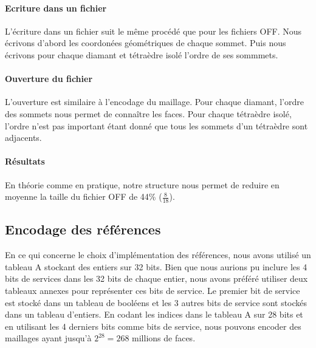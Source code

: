 \paragraph{Ecriture dans un fichier}
L'écriture dans un fichier suit le même procédé que pour les fichiers OFF. Nous écrivons d'abord les coordonées géométriques de chaque sommet. Puis nous écrivons pour chaque diamant et tétraèdre isolé l'ordre de ses sommmets.

\paragraph{Ouverture du fichier}
L'ouverture est similaire à l'encodage du maillage. Pour chaque diamant, l'ordre des sommets nous permet de connaître les faces. Pour chaque tétraèdre isolé, l'ordre n'est pas important étant donné que tous les sommets d'un tétraèdre sont adjacents.

\paragraph{Résultats}
En théorie comme en pratique, notre structure nous permet de reduire en moyenne la taille du fichier OFF de 44\% ($\frac{8}{18}$).

\subsection{Encodage des références}
\noindent
En ce qui concerne le choix d'implémentation des références, nous avons utilisé un tableau A stockant des entiers sur 32 bits. Bien que nous aurions pu inclure les 4 bits de services dans les 32 bits de chaque entier, nous avons préféré utiliser deux tableaux annexes pour représenter ces bits de service. Le premier bit de service est stocké dans un tableau de booléens et les 3 autres bits de service sont stockés dans un tableau d'entiers. En codant les indices dans le tableau A sur 28 bits et en utilisant les 4 derniers bits comme bits de service, nous pouvons encoder des maillages ayant jusqu'à $2^{28}=268$ millions de faces.
